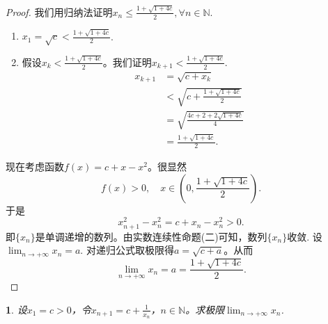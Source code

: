 \documentclass[utf8]{book}
\newtheorem{example}{}[section]             %
\begin{document}
\begin{proof}
我们用归纳法证明$x_n \leq \displaystyle\frac{1+\sqrt{1+4c}}{2}, \forall n\in\mathbb{N}$.
\renewcommand\labelenumi{\normalfont(\theenumi)}
\begin{enumerate}
\item $x_1 = \sqrt{c} < \displaystyle\frac{1+\sqrt{1+4c}}{2}$.
\item 假设$x_k < \displaystyle\frac{1+\sqrt{1+4c}}{2}$。我们证明$x_{k+1} < \displaystyle\frac{1+\sqrt{1+4c}}{2}$.
\begin{equation*}
\begin{split}
x_{k+1} &=\sqrt{c+x_{k}} \\&< \sqrt{c+\frac{1+\sqrt{1+4c}}{2}}\\&=\sqrt{\frac{4c+2+2\sqrt{1+4c}}{4}}\\
&=\frac{1+\sqrt{1+4c}}{2}.
\end{split}
\end{equation*}
\end{enumerate}

现在考虑函数$f(x) =c+x-x^2$。很显然$$f(x) > 0, \quad x\in \left(0, \displaystyle\frac{1+\sqrt{1+4c}}{2}\right).$$
于是$$x_{n+1}^2 -x_{n}^2 = c+ x_{n}-x_n^{2} > 0.$$即$\{x_n\}$是单调递增的数列。由实数连续性命题(二)可知，数列$\{x_n\}$收敛. 设$\displaystyle \lim_{n\to +\infty}x_n=a$. 对递归公式取极限得$a=\sqrt{c+a}$。从而
$$\displaystyle \lim_{n\to +\infty}x_n=a =\frac{1+\sqrt{1+4c}}{2}.$$
\end{proof}
\begin{example}
设$x_1=c>0$，令$\displaystyle x_{n+1} = c + \frac{1}{x_n}$，$n\in\mathbb{N}$。求极限$\displaystyle \lim_{n\to +\infty}x_n$.
\end{example}
\end{document}

